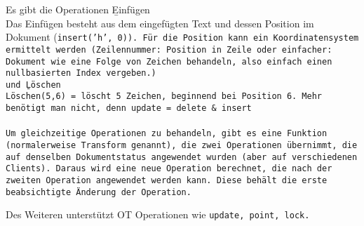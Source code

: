 Es gibt die Operationen \b{Einfügen}\\
Das Einfügen besteht aus dem eingefügten Text und dessen Position im Dokument (\tt{insert('h', 0)}).
Für die Position kann ein Koordinatensystem ermittelt werden (Zeilennummer: Position in Zeile oder einfacher: Dokument wie eine Folge von Zeichen behandeln, also einfach einen nullbasierten Index vergeben.)\\
und \b{Löschen}\\
Löschen(5,6) = löscht 5 Zeichen, beginnend bei Position 6.
Mehr benötigt man nicht, denn update = delete \& insert\\\\
Um gleichzeitige Operationen zu behandeln, gibt es eine Funktion (normalerweise \texttt{Transform} genannt), die zwei Operationen übernimmt, die auf denselben Dokumentstatus angewendet wurden (aber auf verschiedenen Clients).
Daraus wird eine neue Operation berechnet, die nach der zweiten Operation angewendet werden kann. Diese behält die erste beabsichtigte Änderung der Operation.

Des Weiteren unterstützt \gls{OT} Operationen wie \tt{update}, \tt{point}, \tt{lock}.
